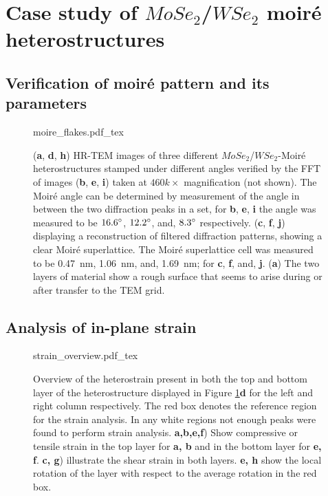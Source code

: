 \section{Case study of $MoSe_2$/$WSe_2$ moiré heterostructures}

\subsection{Verification of moiré pattern and its parameters}

\begin{figure}[h]
    \centering
    \def\svgwidth{.9\linewidth}
    {moire_flakes.pdf_tex}
    \caption{(\textbf{a}, \textbf{d}, \textbf{h}) HR-TEM images of three different $MoSe_2$/$WSe_2$-Moiré heterostructures stamped under different angles verified by the FFT of images (\textbf{b}, \textbf{e}, \textbf{i}) taken at $460k\times$ magnification (not shown). The Moiré angle can be determined by measurement of the angle in between the two diffraction peaks in a set, for \textbf{b}, \textbf{e}, \textbf{i} the angle was measured to be $16.6\degree$, $12.2\degree$, and, $8.3\degree$ respectively. (\textbf{c}, \textbf{f}, \textbf{j}) displaying a reconstruction of filtered diffraction patterns, showing a clear Moiré superlattice. The Moiré superlattice cell was measured to be \SI{0.47}{nm}, \SI{1.06}{nm}, and, \SI{1.69}{nm}; for \textbf{c}, \textbf{f}, and, \textbf{j}. (\textbf{a}) The two layers of material show a rough surface that seems to arise during or after transfer to the TEM grid.}
    \label{fig:moire_overview}
\end{figure}




\subsection{Analysis of in-plane strain}
\begin{figure}[h]
    \centering
    \def\svgwidth{.74\linewidth}
    {strain_overview.pdf_tex}
    \caption{Overview of the heterostrain present in both the top and bottom layer of the heterostructure displayed in Figure \ref{fig:moire_overview}\textbf{d} for the left and right column respectively. The red box denotes the reference region for the strain analysis. In any white regions not enough peaks were found to perform strain analysis. \textbf{a,b,e,f}) Show compressive or tensile strain in the top layer for \textbf{a, b} and in the bottom layer for \textbf{e, f}. \textbf{c, g}) illustrate the shear strain in both layers. \textbf{e, h} show the local rotation of the layer with respect to the average rotation in the red box.}
    \label{fig:strain_overview}
\end{figure}

